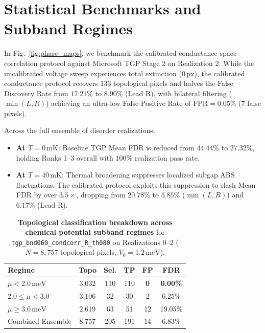 \documentclass[aps,prb,reprint,superscriptaddress,amsmath,amssymb,floatfix]{revtex4-2}
\begin{document}
\section{Statistical Benchmarks and Subband Regimes}

In Fig.~\ref{fig:phase_maps}, we benchmark the calibrated conductance-space correlation protocol against Microsoft TGP Stage 2 on Realization 2. While the uncalibrated voltage sweep experiences total extinction ($0\,\text{px}$), the calibrated conductance protocol recovers 133 topological pixels and halves the False Discovery Rate from $17.21\%$ to $8.90\%$ (Lead R), with bilateral filtering ($\min(L, R)$) achieving an ultra-low False Positive Rate of $\mathrm{FPR} = 0.05\%$ (7 false pixels).

Across the full ensemble of disorder realizations:
\begin{itemize}
    \item \textbf{At $T = 0\,\mathrm{mK}$}: Baseline TGP Mean FDR is reduced from $44.44\%$ to $27.32\%$, holding Ranks 1--3 overall with $100\%$ realization pass rate.
    \item \textbf{At $T = 40\,\mathrm{mK}$}: Thermal broadening suppresses localized subgap ABS fluctuations. The calibrated protocol exploits this suppression to slash Mean FDR by over $3.5\times$, dropping from $20.78\%$ to $\mathbf{5.85\%}$ ($\min(L, R)$) and $\mathbf{6.17\%}$ (Lead R).
\end{itemize}

\begin{table}[t]
\caption{\textbf{Topological classification breakdown across chemical potential subband regimes} for \texttt{tgp\_bnd060\_condcorr\_R\_th080} on Realizations 0--2 ($N=8,757$ topological pixels, $V_0 = 1.2\,\mathrm{meV}$).}
\label{tab:mu_breakdown}
\begin{ruledtabular}
\begin{tabular}{lccccc}
Regime & Topo & Sel. & TP & FP & FDR \\
\hline
$\mu < 2.0\,\mathrm{meV}$ & 3,032 & 110 & 110 & \textbf{0} & \textbf{0.00\%} \\
$2.0 \le \mu < 3.0$ & 3,106 & 32 & 30 & 2 & 6.25\% \\
$\mu \ge 3.0\,\mathrm{meV}$ & 2,619 & 63 & 51 & 12 & 19.05\% \\
\hline
Combined Ensemble & 8,757 & 205 & 191 & 14 & 6.83\% \\
\end{tabular}
\end{ruledtabular}
\end{table}
\end{document}
